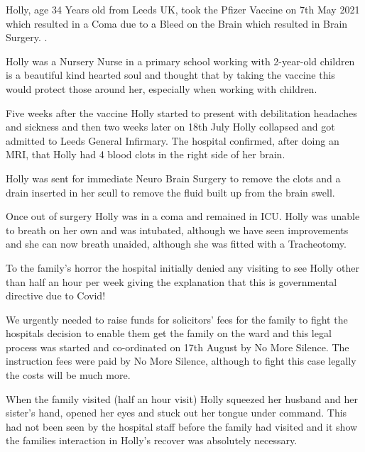 Holly, age 34 Years old from Leeds UK, took the Pfizer Vaccine on 7th May 2021
which resulted in a Coma due to a Bleed on the Brain which resulted in Brain
Surgery. .

Holly was a Nursery Nurse in a primary school working with 2-year-old children
is a beautiful kind hearted soul and thought that by taking the vaccine this
would protect those around her, especially when working with children.

Five weeks after the vaccine Holly started to present with debilitation
headaches and sickness and then two weeks later on 18th July Holly collapsed and
got admitted to Leeds General Infirmary. The hospital confirmed, after doing an
MRI, that Holly had 4 blood clots in the right side of her brain.

Holly was sent for immediate Neuro Brain Surgery to remove the clots and a drain
inserted in her scull to remove the fluid built up from the brain swell.

Once out of surgery Holly was in a coma and remained in ICU. Holly was unable to
breath on her own and was intubated, although we have seen improvements and she
can now breath unaided, although she was fitted with a Tracheotomy.

To the family’s horror the hospital initially denied any visiting to see Holly
other than half an hour per week giving the explanation that this is
governmental directive due to Covid!

We urgently needed to raise funds for solicitors’ fees for the family to fight
the hospitals decision to enable them get the family on the ward and this legal
process was started and co-ordinated on 17th August by No More Silence. The
instruction fees were paid by No More Silence, although to fight this case
legally the costs will be much more.

When the family visited (half an hour visit) Holly squeezed her husband and her
sister’s hand, opened her eyes and stuck out her tongue under command. This had
not been seen by the hospital staff before the family had visited and it show
the families interaction in Holly’s recover was absolutely necessary.

